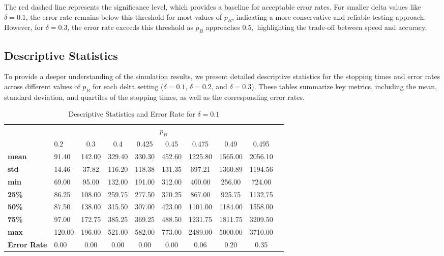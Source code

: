 \documentclass[magisterska, english]{pwr_wmat_praca_dyplomowa}
\theoremstyle{plain}
\numberwithin{theorem}{chapter}
\theoremstyle{definition}
\numberwithin{theorem}{chapter}
\begin{document}
The red dashed line represents the significance level, which provides a baseline for acceptable error rates. For smaller delta values like \( \delta = 0.1 \), the error rate remains below this threshold for most values of \( p_B \), indicating a more conservative and reliable testing approach. However, for \( \delta = 0.3 \), the error rate exceeds this threshold as \( p_B \) approaches 0.5,~highlighting the trade-off between speed and accuracy.

\subsection{Descriptive Statistics}

To provide a deeper understanding of the simulation results, we present detailed descriptive statistics for the stopping times and error rates across different values of \( p_B \) for each delta setting (\( \delta = 0.1 \), \( \delta = 0.2 \), and \( \delta = 0.3 \)). These tables summarize key metrics, including the mean, standard deviation, and quartiles of the stopping times, as well as the corresponding error rates.

\begin{table}[H]
	\centering
	\caption{Descriptive Statistics and Error Rate for \( \delta = 0.1 \)}
	\label{tab:descriptive_stats_delta_01}
	\begin{tabular}{llcccccccc}
		\toprule
		& \multicolumn{8}{c}{$p_B$} \\ \cmidrule(lr){2-9}
		& 0.2 & 0.3 & 0.4 & 0.425 & 0.45 & 0.475 & 0.49 & 0.495 \\
		\midrule
		\textbf{mean} & 91.40 & 142.00 & 329.40 & 330.30 & 452.60 & 1225.80 & 1565.00 & 2056.10 \\
		\textbf{std} & 14.46 & 37.82 & 116.20 & 118.38 & 131.35 & 697.21 & 1360.89 & 1194.56 \\
		\textbf{min} & 69.00 & 95.00 & 132.00 & 191.00 & 312.00 & 400.00 & 256.00 & 724.00 \\
		\textbf{25\%} & 86.25 & 108.00 & 259.75 & 277.50 & 370.25 & 867.00 & 925.75 & 1132.75 \\
		\textbf{50\%} & 87.50 & 138.00 & 315.50 & 307.00 & 423.00 & 1101.00 & 1184.00 & 1558.00 \\
		\textbf{75\%} & 97.00 & 172.75 & 385.25 & 369.25 & 488.50 & 1231.75 & 1811.75 & 3209.50 \\
		\textbf{max} & 120.00 & 196.00 & 521.00 & 582.00 & 773.00 & 2489.00 & 5000.00 & 3710.00 \\
		\textbf{Error Rate} & 0.00 & 0.00 & 0.00 & 0.00 & 0.00 & 0.06 & 0.20 & 0.35 \\
		\bottomrule
	\end{tabular}
\end{table}
\end{document}
